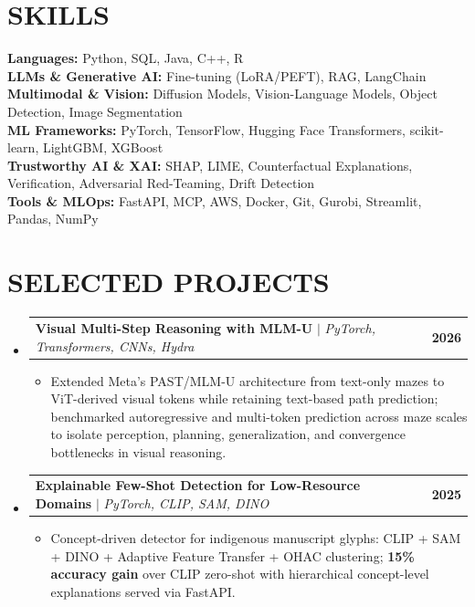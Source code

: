 \documentclass[letterpaper,11pt]{article}
\makeatletter
\newcommand{\resumeItem}[1]{
  \item\small{{#1 \vspace{-2pt}}}
}
\newcommand{\resumeProjectHeading}[2]{
    \item
    \begin{tabular*}{1.001\textwidth}{l@{\extracolsep{\fill}}r}
      \small#1 & \textbf{\small #2}\\
    \end{tabular*}\vspace{-7pt}
}
\newcommand{\resumeSubHeadingListStart}{\begin{itemize}[leftmargin=0.0in, label={}]}
\newcommand{\resumeSubHeadingListEnd}{\end{itemize}}
\newcommand{\resumeItemListStart}{\begin{itemize}[leftmargin=0.15in]}
\newcommand{\resumeItemListEnd}{\end{itemize}\vspace{-4pt}}
\makeatother
\begin{document}
\section{SKILLS}
\vspace{-3pt}
\begin{itemize}[leftmargin=0.0in, label={}]
  \small{\item{
    \textbf{Languages:} Python, SQL, Java, C++, R \\
    \textbf{LLMs \& Generative AI:}
      Fine-tuning (LoRA/PEFT), RAG, LangChain \\
    \textbf{Multimodal \& Vision:} Diffusion Models, Vision-Language Models,
      Object Detection, Image Segmentation \\
    \textbf{ML Frameworks:}
      PyTorch, TensorFlow, Hugging Face Transformers,
      scikit-learn, LightGBM, XGBoost \\
    \textbf{Trustworthy AI \& XAI:}
      SHAP, LIME, Counterfactual Explanations, Verification, Adversarial Red-Teaming,
      Drift Detection \\
    \textbf{Tools \& MLOps:}
      FastAPI, MCP, AWS, Docker, Git, Gurobi, Streamlit, Pandas, NumPy \\
  }}
\end{itemize}
\vspace{-18pt}

\section{SELECTED PROJECTS}
\vspace{-8pt}
\resumeSubHeadingListStart

\resumeProjectHeading
  {\textbf{Visual Multi-Step Reasoning with MLM-U}
   $|$ \emph{PyTorch, Transformers, CNNs, Hydra}}{2026}
\resumeItemListStart
\vspace{2pt}
\resumeItem{Extended Meta's PAST/MLM-U architecture from text-only mazes to ViT-derived visual
  tokens while retaining text-based path prediction; benchmarked autoregressive and multi-token
  prediction across maze scales to isolate perception, planning, generalization, and convergence
  bottlenecks in visual reasoning.}
\resumeItemListEnd

\vspace{-12pt}

\resumeProjectHeading
  {\textbf{Explainable Few-Shot Detection for Low-Resource Domains}
   $|$ \emph{PyTorch, CLIP, SAM, DINO}}{2025}
\resumeItemListStart
\vspace{2pt}
\resumeItem{Concept-driven detector for indigenous manuscript glyphs: CLIP + SAM + DINO +
  Adaptive Feature Transfer + OHAC clustering;
  \textbf{15\% accuracy gain} over CLIP zero-shot with hierarchical concept-level
  explanations served via FastAPI.}
\resumeItemListEnd

\resumeSubHeadingListEnd
\end{document}
